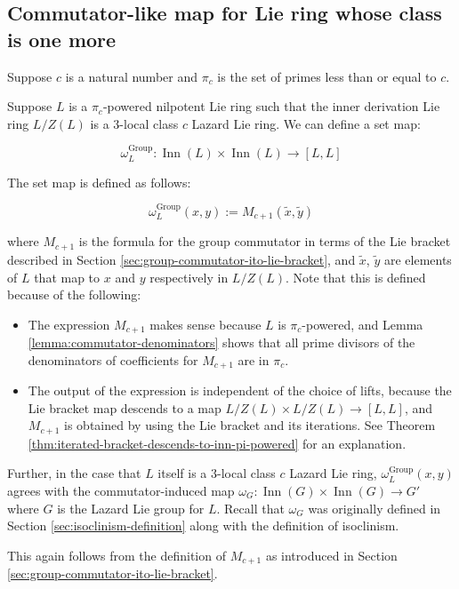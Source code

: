 \documentclass{ucetd}
\begin{document}
\subsection{Commutator-like map for Lie ring whose class is one more}\label{sec:commutator-like-map}

Suppose $c$ is a natural number and $\pi_c$ is the set of primes less
than or equal to $c$.

Suppose $L$ is a $\pi_c$-powered nilpotent Lie ring such that the
inner derivation Lie ring $L/Z(L)$ is a $3$-local class $c$ Lazard Lie
ring. We can define a set map:

$$\omega_L^{\text{Group}}: \operatorname{Inn}(L) \times \operatorname{Inn}(L) \to [L,L]$$

The set map is defined as follows:

$$\omega^{\text{Group}}_L(x,y) := M_{c+1}(\tilde{x},\tilde{y})$$

where $M_{c+1}$ is the formula for the group commutator in terms of
the Lie bracket described in Section
\ref{sec:group-commutator-ito-lie-bracket}, and $\tilde{x}$,
$\tilde{y}$ are elements of $L$ that map to $x$ and $y$ respectively
in $L/Z(L)$. Note that
this is defined because of the following:

\begin{itemize}
\item The expression $M_{c+1}$ makes sense because $L$ is $\pi_c$-powered,
  and Lemma \ref{lemma:commutator-denominators} shows that all prime
  divisors of the denominators of coefficients for $M_{c+1}$ are in $\pi_c$.
\item The output of the expression is independent of the choice of
  lifts, because the Lie bracket map descends to a map $L/Z(L) \times
  L/Z(L) \to [L,L]$, and $M_{c+1}$ is obtained by using the Lie
  bracket and its iterations. See Theorem
  \ref{thm:iterated-bracket-descends-to-inn-pi-powered} for an explanation.
\end{itemize}

Further, in the case that $L$ itself is a $3$-local class $c$ Lazard
Lie ring, $\omega_L^{\text{Group}}(x,y)$ agrees with the
commutator-induced map $\omega_G: \operatorname{Inn}(G) \times
\operatorname{Inn}(G) \to G'$ where $G$ is the Lazard Lie group for
$L$. Recall that $\omega_G$ was originally defined in Section
\ref{sec:isoclinism-definition} along with the definition of
isoclinism.

This again follows from the definition of $M_{c+1}$ as introduced in
Section \ref{sec:group-commutator-ito-lie-bracket}.
\end{document}
